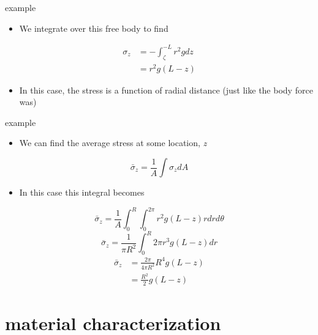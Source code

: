 \documentclass[
  letterpaper,
  ignorenonframetext,
  aspectratio=43,
  handout,
  12pt]{beamer}
\providecommand{\tightlist}{%
  \setlength{\itemsep}{0pt}\setlength{\parskip}{0pt}}
\providecommand{\tightlist}{%
\setlength{\itemsep}{0pt}\setlength{\parskip}{0pt}}
\begin{document}
\begin{frame}{example}
\protect\hypertarget{example-5}{}
\begin{itemize}
\tightlist
\item
  We integrate over this free body to find
\end{itemize}

\[\begin{aligned}
    \sigma_z &=  -\int_\zeta^{-L} r^2 g dz\\
    &= r^2 g (L-z)
\end{aligned}\]

\begin{itemize}
\tightlist
\item
  In this case, the stress is a function of radial distance (just like
  the body force was)
\end{itemize}
\end{frame}

\begin{frame}{example}
\protect\hypertarget{example-6}{}
\begin{itemize}
\tightlist
\item
  We can find the average stress at some location, \emph{z}
\end{itemize}

\[\bar{\sigma}_z = \frac{1}{A} \int \sigma_z dA\]

\begin{itemize}
\tightlist
\item
  In this case this integral becomes
\end{itemize}

\[\bar{\sigma}_z = \frac{1}{A} \int_0^R \int_0^{2\pi} r^2 g (L-z) r dr d\theta\]
\[\bar{\sigma}_z = \frac{1}{\pi R^2} \int_0^R 2 \pi r^3 g (L-z) dr\]
\[\begin{aligned}
    \bar{\sigma}_z &= \frac{2 \pi }{4 \pi R^2} R^4 g (L-z)\\
    &= \frac{R^2}{2} g (L-z)
\end{aligned}\]
\end{frame}

\hypertarget{material-characterization}{%
\section{material characterization}\label{material-characterization}}
\end{document}
